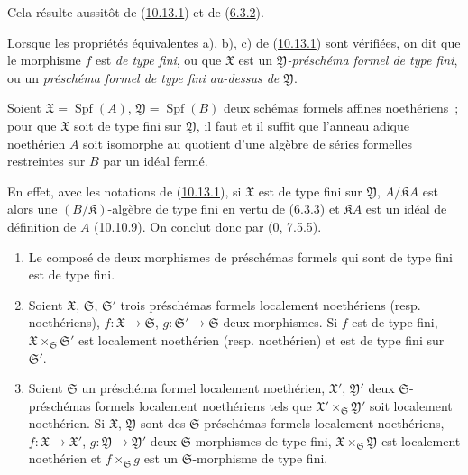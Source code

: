 Cela résulte aussitôt de (\hyperref[I.10.13.1-fr]{10.13.1}) et de
(\hyperref[I.6.3.2-fr]{6.3.2}).

\begin{definition}[10.13.3]
\label{I.10.13.3-fr}
Lorsque les propriétés équivalentes a), b), c) de
(\hyperref[I.10.13.1-fr]{10.13.1}) sont vérifiées, on dit que le morphisme
$f$ est \emph{de type fini}, ou que $\mathfrak{X}$ est un
\emph{$\mathfrak{Y}$-préschéma formel de type fini}, ou un
\emph{préschéma formel de type fini au-dessus de $\mathfrak{Y}$}.
\end{definition}

\begin{corollary}[10.13.4]
\label{I.10.13.4-fr}
Soient $\mathfrak{X}=\operatorname{Spf}(A)$,
$\mathfrak{Y}=\operatorname{Spf}(B)$ deux schémas formels affines
noethériens~; pour que $\mathfrak{X}$ soit de type fini sur
$\mathfrak{Y}$, il faut et il suffit que l'anneau adique noethérien $A$ soit
isomorphe au quotient d'une algèbre de séries formelles restreintes sur $B$
par un idéal fermé.
\end{corollary}

En effet, avec les notations de (\hyperref[I.10.13.1-fr]{10.13.1}), si
$\mathfrak{X}$ est de type fini sur $\mathfrak{Y}$,
$A/\mathfrak{K}A$ est alors une $(B/\mathfrak{K})$-algèbre de type fini en
vertu de (\hyperref[I.6.3.3-fr]{6.3.3}) et $\mathfrak{K}A$ est un idéal de
définition de $A$ (\hyperref[I.10.10.9-fr]{10.10.9}). On conclut donc par
(\hyperref[0.7.5.5-fr]{0, 7.5.5}).

\begin{proposition}[10.13.5]
\label{I.10.13.5-fr}
\medskip\noindent
\begin{enumerate}
  \item[\rm{(i)}] Le composé de deux morphismes de préschémas formels qui
    sont de type fini est de type fini.


  \item[\rm{(ii)}] Soient $\mathfrak{X}$, $\mathfrak{S}$,
    $\mathfrak{S}'$ trois préschémas formels localement noethériens (resp.
    noethériens), $f:\mathfrak{X}\to\mathfrak{S}$,
    $g:\mathfrak{S}'\to\mathfrak{S}$ deux morphismes. Si $f$ est de type
    fini, $\mathfrak{X}\times_{\mathfrak{S}}\mathfrak{S}'$ est localement
    noethérien (resp. noethérien) et est de type fini sur $\mathfrak{S}'$.
  \item[\rm{(iii)}] Soient $\mathfrak{S}$ un préschéma formel localement
    noethérien, $\mathfrak{X}'$, $\mathfrak{Y}'$ deux
    $\mathfrak{S}$-préschémas formels localement noethériens tels que
    $\mathfrak{X}'\times_{\mathfrak{S}}\mathfrak{Y}'$ soit localement
    noethérien. Si $\mathfrak{X}$, $\mathfrak{Y}$ sont des
    $\mathfrak{S}$-préschémas formels localement noethériens,
    $f:\mathfrak{X}\to\mathfrak{X}'$,
    $g:\mathfrak{Y}\to\mathfrak{Y}'$ deux $\mathfrak{S}$-morphismes de
    type fini, $\mathfrak{X}\times_{\mathfrak{S}}\mathfrak{Y}$ est
    localement noethérien et $f\times_{\mathfrak{S}}g$ est un
    $\mathfrak{S}$-morphisme de type fini.
\end{enumerate}
\end{proposition}

